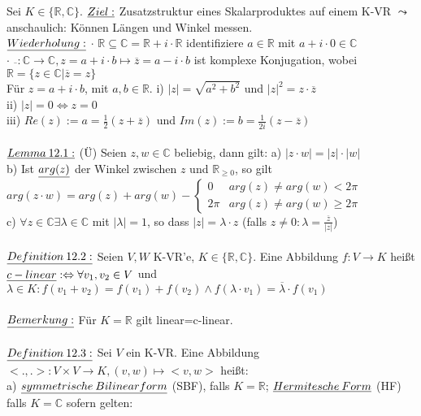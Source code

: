 \documentclass[fleqn, a4paper, 11pt]{article}
\begin{document}
Sei $K\in\{\mathbb{R},\mathbb{C}\}$. $\uline{Ziel:}$ Zusatzstruktur eines Skalarproduktes auf einem K-VR $\leadsto$anschaulich: K\"onnen L\"angen und Winkel \dq messen\dq.\\
$\uline{Wiederholung:}$ $\cdot$ $\mathbb{R}\subseteq\mathbb{C}=\mathbb{R}+i\cdot\mathbb{R}$ identifiziere $a\in\mathbb{R}$ mit $a+i\cdot0\in\mathbb{C}$\\
$\cdot$ $\overline{}:\mathbb{C}\rightarrow\mathbb{C},z=a+i\cdot b\mapsto\overline{z}=a-i\cdot b$ ist komplexe Konjugation, wobei $\mathbb{R}=\{z\in\mathbb{C}|\overline{z}=z\}$\\
F\"ur $z=a+i\cdot b$, mit $a,b\in\mathbb{R}$. i) $|z|=\sqrt{a^2+b^2}$ und $|z|^2=z\cdot\overline{z}$\\
ii) $|z|=0\Leftrightarrow z=0$\\
iii) $Re(z):=a=\tfrac{1}{2}(z+\overline{z})$ und $Im(z):=b=\tfrac{1}{2i}(z-\overline{z})$\\
\\
$\uline{Lemma\:12.1:}$ (\"U) Seien $z,w\in\mathbb{C}$ beliebig, dann gilt: a) $|z\cdot w|=|z|\cdot|w|$\\
b) Ist $\uline{arg(z)}$ der Winkel zwischen $z$ und $\mathbb{R}_{\geq 0}$, so gilt $arg(z\cdot w)=arg(z)+arg(w)-\begin{cases}
	0 & arg(z)\neq arg(w)<2\pi\\
	2\pi & arg(z)\neq arg(w)\geq 2\pi
\end{cases}$\\
c) $\forall z\in\mathbb{C}\exists\lambda\in\mathbb{C}$ mit $|\lambda|=1$, so dass $|z|=\lambda\cdot z$ (falls $z\neq 0:\lambda=\tfrac{\overline{z}}{|z|}$)\\
\\
$\uline{Definition\:12.2:}$ Seien $V,W$ K-VR'e, $K\in\{\mathbb{R},\mathbb{C}\}$. Eine Abbildung $f:V\rightarrow K$ hei\ss{}t $\uline{c-linear}:\Leftrightarrow\forall v_1,v_2\in V$ und $\lambda\in K:f(v_1+v_2)=f(v_1)+f(v_2)\wedge f(\lambda\cdot v_1)=\overline{\lambda}\cdot f(v_1)$\\
\\
$\uline{Bemerkung:}$ F\"ur $K=\mathbb{R}$ gilt linear=c-linear.\\
\\
$\uline{Definition\:12.3:}$ Sei $V$ ein K-VR. Eine Abbildung $<.,.>:V\times V\rightarrow K,(v,w)\mapsto <v,w>$ hei\ss{}t:\\
a) $\uline{symmetrische\:Bilinearform}$ (SBF), falls $K=\mathbb{R}$; $\uline{Hermitesche\:Form}$ (HF) falls $K=\mathbb{C}$ sofern gelten:\\
\end{document}

